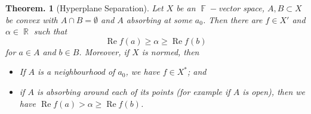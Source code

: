\documentclass[11pt, a4paper]{memoir}
\DeclareMathOperator{\R}{{\mathbb{R}}}
\DeclareMathOperator{\F}{{\mathbb{F}}}
\theoremstyle{change}
\newtheorem{theorem}{Theorem.}[section]
\theoremstyle{plain}
\theoremstyle{nonumberplain}
\renewcommand{\Re}{\ensuremath{\operatorname{Re}}}
\numberwithin{equation}{section}
\begin{document}
\begin{theorem}[Hyperplane Separation]
    Let $X$ be an $\F-$vector space, $A,B\subset X$ be convex with $A\cap B=\emptyset$ and $A$ absorbing at some $a_0$.
    Then there are $f\in X'$ and $\alpha\in\R$ such that
    \begin{equation*}
        \Re f(a)\geq\alpha\geq\Re f(b)
    \end{equation*}
    for $a\in A$ and $b\in B$.
    Moreover, if $X$ is normed, then
    \begin{itemize}[nl]
        \item If $A$ is a neighbourhood of $a_0$, we have $f\in X^*$; and
        \item if $A$ is absorbing around each of its points (for example if $A$ is open), then we have $\Re f(a)>\alpha\geq\Re f(b)$.
    \end{itemize}
\end{theorem}
\end{document}
